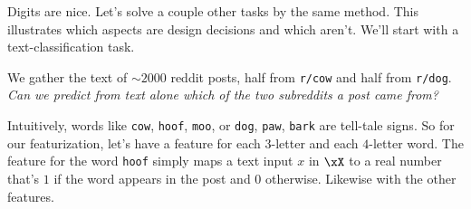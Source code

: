 
  Digits are nice.  Let's solve a couple other tasks by the same method.  This
  illustrates which aspects are design decisions and which aren't.  We'll start
  with a text-classification task.

  We gather the text of $\sim 2000$ reddit posts, half from \texttt{r/cow} and
  half from \texttt{r/dog}.  \emph{Can we predict from text alone which of the
  two subreddits a post came from?}

  Intuitively, words like
  \texttt{cow},
  \texttt{hoof},
  \texttt{moo},
    or
  \texttt{dog},
  \texttt{paw},
  \texttt{bark}
  are tell-tale signs.  So for our featurization, let's have a feature for
  each $3$-letter and each $4$-letter word.  The feature for the word
  \texttt{hoof} simply maps a text input $x$ in $\xX$ to a real number that's
  $1$ if the word appears in the post and $0$ otherwise.  Likewise with the
  other features.


